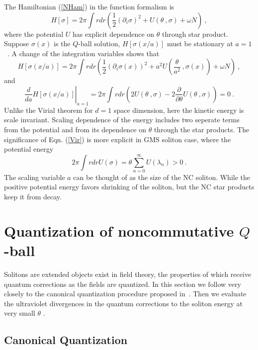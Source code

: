 \documentclass[a4paper,a4paper]{article}
\begin{document}
The Hamiltonian (\ref{NHam}) in the function formalism is 
\begin{equation}
  H[\sigma]=2\pi\int rdr\left(\frac 12(\partial_i\sigma)^2+U(\theta\ , \sigma)+\omega N\right)\ ,
\end{equation}
where the potential $U$ has explicit dependence on $\theta$ 
through star product. Suppose $\sigma(x)$ is the $Q$-ball solution, 
$H[\sigma(x/a)]$ must be stationary at $a=1$\ . A change of the integration variables shows that 
\begin{equation}
  H[\sigma(x/a)]=2\pi\int rdr\left(\frac 12(\partial_i\sigma(x))^2+
a^2U(\frac{\theta}{a^2}\ ,\sigma(x))+\omega N\right)\ ,
\end{equation}
and
\begin{equation}
  \left.\frac {d}{da}H[\sigma(x/a)]\right|_{a=1}=2\pi\int rdr\left(2U(\theta\ , \sigma)
  -2\frac{\partial}{\partial\theta}U(\theta\ , \sigma)\right)=0\ .                                       \label{Vir}
 \end{equation}
Unlike the Virial theorem for $d=1$ space dimension, here the kinetic energy is scale invariant. 
Scaling dependence of the energy includes two seperate terms from the potential and from 
its dependence on $\theta$ through the star products. 
The significance of Eqn. (\ref{Vir}) is more explicit in GMS soliton case, where 
the potential energy 
\begin{equation}
2\pi\int rdrU(\sigma)=\theta\sum_{n=0}^{\infty}U(\lambda_n)>0\ . 
\end{equation}
The scaling variable $a$ can be thought of as the size of the NC soliton. 
While the positive potential energy favors shrinking of the soliton, but 
the NC star products keep it from decay. 

\section{Quantization of noncommutative $Q$-ball}

Solitons are extended objects exist in field theory, the properties of which receive 
quantum corrections as the fields are quantized. In this section 
we follow very closely to the canonical quantization procedure 
proposed in~\cite{ChristLee,LeeReport}. 
Then we evaluate the ultraviolet divergences in the quantum corrections to 
the soliton energy at very small $\theta$ . 

\subsection{Canonical Quantization}
\end{document}
